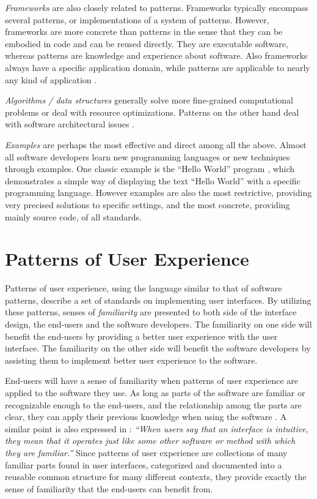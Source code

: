 \documentclass[a4paper,titlepage]{article}
\begin{document}
\textit{Frameworks} are also closely related to patterns. Frameworks
typically encompass several patterns, or implementations of a system
of patterns. However, frameworks are more concrete than patterns in
the sense that they can be embodied in code and can be reused
directly. They are executable software, whereas patterns are knowledge
and experience about software. Also frameworks always have a specific
application domain, while patterns are applicable to nearly any kind
of application \citep{patterns:gamma}.

\textit{Algorithms / data structures} generally solve more
fine-grained computational problems or deal with resource
optimizations. Patterns on the other hand deal with software
architectural issues \citep{patterns:appleton}.

\textit{Examples} are perhaps the most effective and direct among all
the above. Almost all software developers learn new programming
languages or new techniques through examples. One classic example is
the ``Hello World'' program \citep{c:kernighan}, which demonstrates a
simple way of displaying the text ``Hello World'' with a specific
programming language. However examples are also the most restrictive,
providing very precised solutions to specific settings, and the most
concrete, providing mainly source code, of all standards.


\section{Patterns of User Experience}
\label{sec:pux}
Patterns of user experience, using the language similar to that of
software patterns, describe a set of standards on implementing user
interfaces. By utilizing these patterns, senses of
\textit{familiarity} are presented to both side of the interface
design, the end-users and the software developers. The familiarity on
one side will benefit the end-users by providing a better user
experience with the user interface. The familiarity on the other side
will benefit the software developers by assisting them to implement
better user experience to the software.

End-users will have a sense of familiarity when patterns of user
experience are applied to the software they use. As long as parts of
the software are familiar or recognizable enough to the end-users, and
the relationship among the parts are clear, they can apply their
previous knowledge when using the software
\citep[p.~xiii]{patterns:tidwell}. A similar point is also expressed
in \citet[p.~150]{humane:raskin}: {\it ``When users say that an
  interface is intuitive, they mean that it operates just like some
  other software or method with which they are familiar.''} Since
patterns of user experience are collections of many familiar parts
found in user interfaces, categorized and documented into a reusable
common structure for many different contexts, they provide exactly the
sense of familiarity that the end-users can benefit from.
\end{document}
